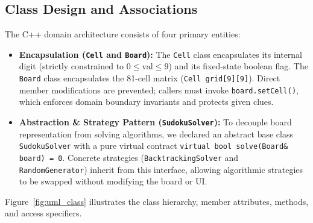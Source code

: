 \documentclass[12pt,a4paper,oneside]{book}
\begin{document}
\subsection{Class Design and Associations}
The C++ domain architecture consists of four primary entities:
\begin{itemize}
    \item \textbf{Encapsulation (\texttt{Cell} and \texttt{Board}):} The \texttt{Cell} class encapsulates its internal digit (strictly constrained to $0 \le \text{val} \le 9$) and its fixed-state boolean flag. The \texttt{Board} class encapsulates the 81-cell matrix (\texttt{Cell grid[9][9]}). Direct member modifications are prevented; callers must invoke \texttt{board.setCell()}, which enforces domain boundary invariants and protects given clues.
    \item \textbf{Abstraction \& Strategy Pattern (\texttt{SudokuSolver}):} To decouple board representation from solving algorithms, we declared an abstract base class \texttt{SudokuSolver} with a pure virtual contract \texttt{virtual bool solve(Board\& board) = 0}. Concrete strategies (\texttt{BacktrackingSolver} and \texttt{RandomGenerator}) inherit from this interface, allowing algorithmic strategies to be swapped without modifying the board or UI.
\end{itemize}

Figure~\ref{fig:uml_class} illustrates the class hierarchy, member attributes, methods, and access specifiers.
\end{document}
